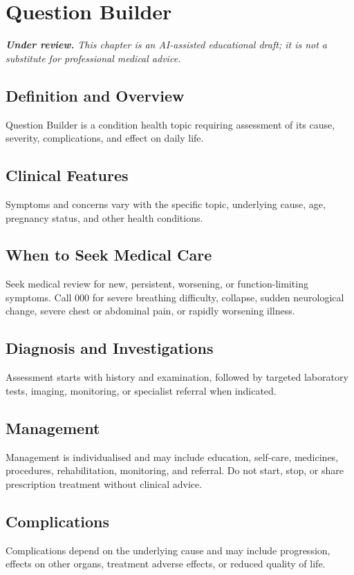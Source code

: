 \chapter{Question Builder}

\medskip
\noindent\textit{\textbf{Under review.} This chapter is an AI-assisted educational draft; it is not a substitute for professional medical advice.}

\section*{Definition and Overview}
Question Builder is a condition health topic requiring assessment of its cause, severity, complications, and effect on daily life.

\section*{Clinical Features}
Symptoms and concerns vary with the specific topic, underlying cause, age, pregnancy status, and other health conditions.

\section*{When to Seek Medical Care}
Seek medical review for new, persistent, worsening, or function-limiting symptoms. Call 000 for severe breathing difficulty, collapse, sudden neurological change, severe chest or abdominal pain, or rapidly worsening illness.

\section*{Diagnosis and Investigations}
Assessment starts with history and examination, followed by targeted laboratory tests, imaging, monitoring, or specialist referral when indicated.

\section*{Management}
Management is individualised and may include education, self-care, medicines, procedures, rehabilitation, monitoring, and referral. Do not start, stop, or share prescription treatment without clinical advice.

\section*{Complications}
Complications depend on the underlying cause and may include progression, effects on other organs, treatment adverse effects, or reduced quality of life.

